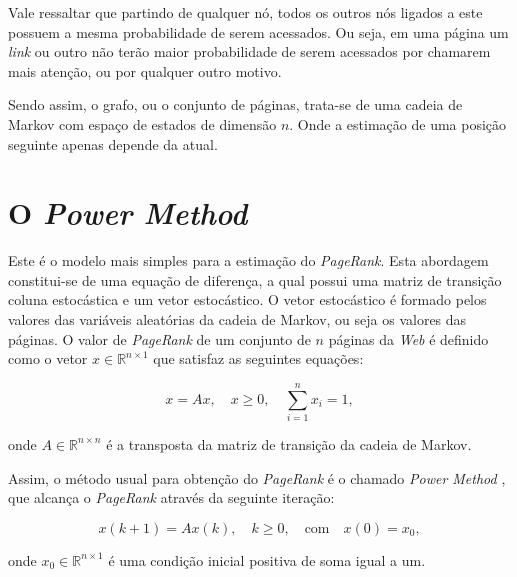 Vale ressaltar que partindo de qualquer nó, todos os outros nós ligados a este possuem a mesma probabilidade de serem acessados. Ou seja, em uma página um \textit{link} ou outro não terão maior probabilidade de serem acessados por chamarem mais atenção, ou por qualquer outro motivo.

Sendo assim, o grafo, ou o conjunto de páginas, trata-se de uma cadeia de Markov com espaço de estados de dimensão $n$. Onde a estimação de uma posição seguinte apenas depende da atual.




\section{O \textit{Power Method}}%

Este é o modelo mais simples para a estimação do \textit{PageRank}. Esta abordagem constitui-se de uma equação de diferença, a qual possui uma matriz de transição coluna estocástica e um vetor estocástico. O vetor estocástico é formado pelos valores das variáveis aleatórias da cadeia de Markov, ou seja os valores das páginas. O valor de \textit{PageRank} de um conjunto de $n$ páginas da \textit{Web} é definido como o vetor $x \in \mathbb{R}^{n \times 1}$ que satisfaz as seguintes equações:

\begin{equation}	
x = Ax, \quad x\geq0, \quad \sum^{n}_{i=1} x_{i} = 1, 
\end{equation}

\noindent onde $A \in \mathbb{R}^{n \times n}$ é a transposta da matriz de transição da cadeia de Markov.

Assim, o método usual para obtenção do \textit{PageRank} é o chamado \textit{Power Method} \cite{ishii2014pagerank}, que alcança o \textit{PageRank} através da seguinte iteração:

\begin{equation}
x(k+1) = Ax(k), \quad k\geq0, \quad \text{com} \quad x(0) = x_0,
\end{equation}

\noindent onde $x_0 \in \mathbb{R}^{n \times 1}$ é uma condição inicial positiva de soma igual a um.


